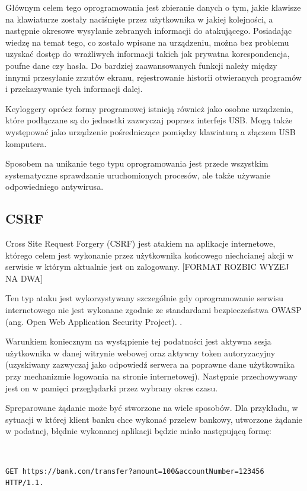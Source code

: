 \documentclass[12pt,twoside]{article}
\begin{document}
{Głównym celem tego oprogramowania jest zbieranie danych o tym, jakie klawisze na klawiaturze zostały naciśnięte przez użytkownika w jakiej kolejności, a następnie okresowe wysyłanie zebranych informacji do atakującego. Posiadając wiedzę na temat tego, co zostało wpisane na urządzeniu, można bez problemu uzyskać dostęp do wrażliwych informacji takich jak prywatna korespondencja, poufne dane czy hasła. Do bardziej zaawansowanych funkcji należy między innymi przesyłanie zrzutów ekranu, rejestrowanie historii otwieranych programów i przekazywanie tych informacji dalej.

Keyloggery oprócz formy programowej istnieją również jako osobne urządzenia, które podłączane są do jednostki zazwyczaj poprzez interfejs USB. Mogą także występować jako urządzenie pośredniczące pomiędzy klawiaturą a złączem USB komputera. 

Sposobem na unikanie tego typu oprogramowania jest przede wszystkim systematyczne sprawdzanie uruchomionych procesów, ale także używanie odpowiedniego antywirusa.
\clearpage

\subsection{CSRF}
Cross Site Request Forgery (CSRF) jest atakiem na aplikacje internetowe, którego celem jest wykonanie przez użytkownika końcowego niechcianej akcji w serwisie w którym aktualnie jest on zalogowany. 
[FORMAT ROZBIC WYZEJ NA DWA]


Ten typ ataku jest wykorzystywany szczególnie gdy oprogramowanie serwisu internetowego nie jest wykonane zgodnie ze standardami bezpieczeństwa OWASP (ang. Open Web Application Security Project). \cite{OWASP10}.

Warunkiem koniecznym na wystąpienie tej podatności jest aktywna sesja użytkownika w danej witrynie webowej oraz aktywny token autoryzacyjny (uzyskiwany zazwyczaj jako odpowiedź serwera na poprawne dane użytkownika przy mechanizmie logowania na stronie internetowej). Następnie przechowywany jest on w pamięci przeglądarki przez wybrany okres czasu.

Spreparowane żądanie może być stworzone na wiele sposobów. Dla przykładu, w sytuacji w której klient banku chce wykonać przelew bankowy, utworzone żądanie w podatnej, błędnie wykonanej aplikacji będzie miało następującą formę:

\

\begin{lstlisting}[caption=Przykładowe żądanie aplikacji podatnej na CSRF,label={KodPHP1}]
	GET https://bank.com/transfer?amount=100&accountNumber=123456 HTTP/1.1. 
\end{lstlisting}

}
\end{document}
